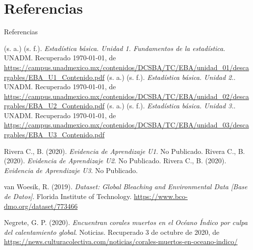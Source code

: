 \documentclass[11pt]{beamer}
\begin{document}
\section{Referencias}
\begin{frame}{Referencias}
	\begin{thebibliography}{X}\tiny
	
		 (s. a.) (s. f.). \textit{Estadística básica. Unidad 1. Fundamentos de la estadística}. UNADM. Recuperado \today, de \url{https://campus.unadmexico.mx/contenidos/DCSBA/TC/EBA/unidad_01/descargables/EBA_U1_Contenido.pdf}
		 (s. a.) (s. f.). \textit{Estadística básica. Unidad 2.}. UNADM. Recuperado \today, de \url{https://campus.unadmexico.mx/contenidos/DCSBA/TC/EBA/unidad_02/descargables/EBA_U2_Contenido.pdf}
		 (s. a.) (s. f.). \textit{Estadística básica. Unidad 3.}. UNADM. Recuperado \today, de \url{https://campus.unadmexico.mx/contenidos/DCSBA/TC/EBA/unidad_03/descargables/EBA_U3_Contenido.pdf}
		
		 Rivera C., B. (2020). \textit{Evidencia de Aprendizaje U1}. No Publicado.
		 Rivera C., B. (2020). \textit{Evidencia de Aprendizaje U2}. No Publicado.
		 Rivera C., B. (2020). \textit{Evidencia de Aprendizaje U3}. No Publicado.
		
		 van Woesik, R. (2019). \textit{Dataset: Global Bleaching and Environmental Data [Base de Datos]}. Florida Institute of Technology. \url{https://www.bco-dmo.org/dataset/773466}
	
		 Negrete, G. P. (2020). \textit{Encuentran corales muertos en el Océano Índico por culpa del calentamiento global}. Noticias. Recuperado 3 de octubre de 2020, de \url{https://news.culturacolectiva.com/noticias/corales-muertos-en-oceano-indico/}
	
	\end{thebibliography}
\end{frame}
\end{document}
